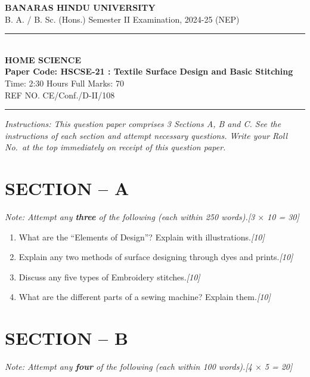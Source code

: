 \documentclass[11pt,a4paper]{article}
\newcommand{\pts}[1]{\hfill \textit{[#1]}}
\begin{document}
\begin{center}
  {\large\bfseries BANARAS HINDU UNIVERSITY}\\[2pt]
  {\normalsize B. A. / B. Sc. (Hons.) Semester II Examination, 2024-25 (NEP)}\\[6pt]
  \rule{0.8\linewidth}{0.5pt}\\[6pt]
  {\large\bfseries HOME SCIENCE}\\[4pt]
  {\large\bfseries Paper Code: HSCSE-21 : Textile Surface Design and Basic Stitching}\\[4pt]
  {\normalsize Time: 2:30 Hours \hfill Full Marks: 70}\\[2pt]
  {\small REF NO. CE/Conf./D-II/108}
\end{center}
\rule{\linewidth}{0.4pt}
\smallskip

\noindent \textit{Instructions: This question paper comprises 3 Sections A, B and C. See the instructions of each section and attempt necessary questions. Write your Roll No.\ at the top immediately on receipt of this question paper.}

\bigskip

\section*{SECTION -- A}
\noindent \textit{Note: Attempt any \textbf{three} of the following (each within 250 words).}\pts{3 $\times$ 10 = 30}

\begin{enumerate}[label=\textbf{\arabic*.},leftmargin=*,itemsep=10pt]

  \item What are the ``Elements of Design''? Explain with illustrations.\pts{10}

  \item Explain any two methods of surface designing through dyes and prints.\pts{10}

  \item Discuss any five types of Embroidery stitches.\pts{10}

  \item What are the different parts of a sewing machine? Explain them.\pts{10}

\end{enumerate}

\bigskip

\section*{SECTION -- B}
\noindent \textit{Note: Attempt any \textbf{four} of the following (each within 100 words).}\pts{4 $\times$ 5 = 20}
\end{document}

